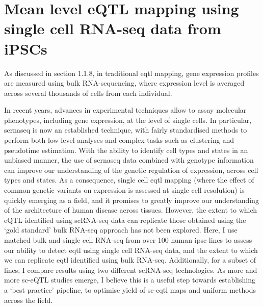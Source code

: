 
\chapter{Mean level eQTL mapping using single cell RNA-seq data from iPSCs}
\label{chapter3}

As discussed in section 
1.1.8, in traditional \gls{eqtl} mapping, gene expression profiles are measured using bulk RNA-sequencing, where expression level is averaged across several thousands of cells from each individual.

In recent years, advances in experimental techniques allow to assay molecular phenotypes, including gene expression, at the level of single cells.
In particular, \gls{scrnaseq} is now an established technique, with fairly standardised methods to perform both low-level analyses and complex tasks such as clustering and pseudotime estimation.
With the ability to identify cell types and states in an unbiased manner, the use of \gls{scrnaseq} data 
combined with genotype information can improve
our understanding of the genetic regulation of expression, across
cell types and states.
As a consequence, single cell \gls{eqtl} mapping (where 
the effect of common genetic variants on expression is assessed at single cell resolution)
is quickly emerging as a field, and it promises to greatly improve our understanding of the architecture of human disease across tissues.
However, the extent to which eQTL identified using scRNA-seq data can replicate those obtained using the `gold standard' bulk RNA-seq approach has not been explored.
Here, I use matched bulk and single cell RNA-seq from over 100 human \gls{ipsc} lines to assess our ability to detect \gls{eqtl} using single cell RNA-seq data, and the extent to which we can replicate \gls{eqtl} identified using bulk RNA-seq.
Additionally, for a subset of lines, I compare results using two different scRNA-seq technologies.
As more and more sc-eQTL studies emerge, I believe this is a useful step towards establishing a `best practice' pipeline, to optimise yield of sc-\gls{eqtl} maps and uniform methods across the field.

